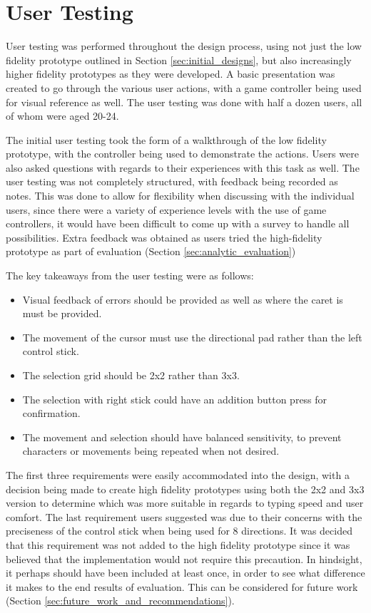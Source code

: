 \documentclass[testing.tex]{subfiles}
\begin{document}
\section{User Testing} %
\label{sec:user_testing}
User testing was performed throughout the design process, using not just the
low fidelity prototype outlined in Section \ref{sec:initial_designs}, but also
increasingly higher fidelity prototypes as they were developed. A basic
presentation was created to go through the various user actions, with a game
controller being used for visual reference as well. The user testing was done
with half a dozen users, all of whom were aged 20-24.

The initial user testing took the form of a walkthrough of the low fidelity
prototype, with the controller being used to demonstrate the actions. Users
were also asked questions with regards to their experiences with this task as
well. The user testing was not completely structured, with feedback being
recorded as notes. This was done to allow for flexibility when discussing with
the individual users, since there were a variety of experience levels with the
use of game controllers, it would have been difficult to come up with a survey
to handle all possibilities. Extra feedback was obtained as users tried the
high-fidelity prototype as part of evaluation (Section
\ref{sec:analytic_evaluation})

The key takeaways from the user testing were as follows:

\begin{itemize}
	\item Visual feedback of errors should be provided as well as where the
    caret is must be provided.
	\item The movement of the cursor must use the directional pad rather than
	the left control stick.
	\item The selection grid should be 2x2 rather than 3x3.
	\item The selection with right stick could have an addition button press for
	confirmation.
	\item The movement and selection should have balanced sensitivity, to
    prevent characters or movements being repeated when not desired.
\end{itemize}

The first three requirements were easily accommodated into the design, with a
decision being made to create high fidelity prototypes using both the 2x2 and
3x3 version to determine which was more suitable in regards to typing speed and
user comfort. The last requirement users suggested was due to their concerns
with the preciseness of the control stick when being used for 8 directions. It
was decided that this requirement was not added to the high fidelity prototype
since it was believed that the implementation would not require this precaution.
In hindsight, it perhaps should have been included at least once, in order to 
see what difference it makes to the end results of evaluation. This can be
considered for future work (Section \ref{sec:future_work_and_recommendations}).
\end{document}

